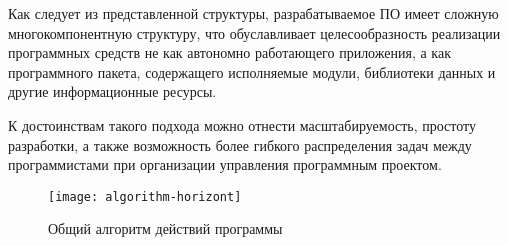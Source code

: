 \vspace{\baselineskip}
Как следует из представленной структуры, разрабатываемое ПО имеет сложную многокомпонентную структуру, что обуславливает целесообразность реализации программных средств не как автономно работающего приложения, а как программного пакета, содержащего исполняемые модули, библиотеки данных и другие информационные ресурсы.

\vspace{\baselineskip}
К достоинствам такого подхода можно отнести масштабируемость, простоту разработки, а также возможность более гибкого распределения задач между программистами при организации управления программным проектом.

\begin{landscape}
\begin{figure}[h!]
  \centering
  \texttt{[image: algorithm-horizont]}
  \caption{Общий алгоритм действий программы}
  \label{img:algorithm-horizont}
\end{figure}
\end{landscape}